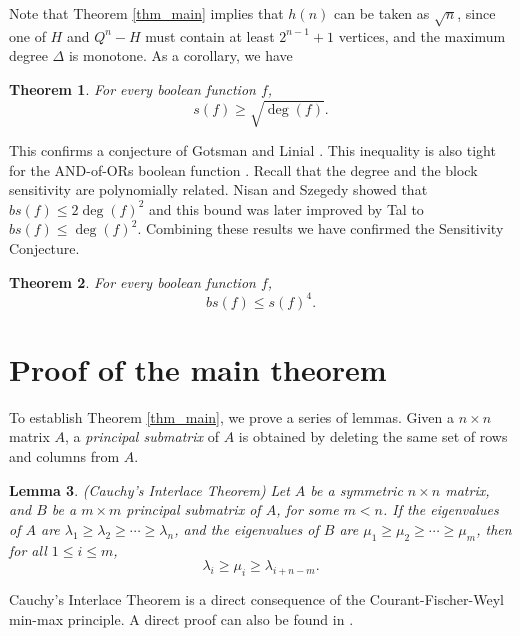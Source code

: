\documentclass[12pt]{article}
\theoremstyle{plain}
\newtheorem{theorem}{Theorem}[section]
\newtheorem{lemma}[theorem]{Lemma}
\theoremstyle{definition}
\begin{document}
Note that Theorem \ref{thm_main} implies that $h(n)$ can be taken as $\sqrt{n}$, since one of $H$ and $Q^n-H$ must contain at least $2^{n-1}+1$ vertices, and the maximum degree $\Delta$ is monotone. As a corollary, we have
\begin{theorem}
For every boolean function $f$,
$$s(f) \ge \sqrt{\deg(f)}.$$
\end{theorem}
This confirms a conjecture of Gotsman and Linial \cite{gotsman-linial}. This inequality is also tight for the AND-of-ORs boolean function \cite[Example 5.2]{survey}. Recall that the degree and the block sensitivity are polynomially related. Nisan and Szegedy \cite{nisan-szegedy} showed that $bs(f) \le 2 \deg(f)^2$ and this bound was later improved by Tal \cite{tal} to $bs(f) \le \deg(f)^2$. Combining these results we have confirmed the Sensitivity Conjecture.

\begin{theorem}\label{thm_sensitivity}
For every boolean function $f$, 
$$bs(f) \le s(f)^4.$$
\end{theorem}


\section{Proof of the main theorem}
To establish Theorem \ref{thm_main}, we prove a series of lemmas. Given a $n \times n$ matrix $A$, a {\it principal submatrix} of $A$ is obtained by deleting the same set of rows and columns from $A$.
\begin{lemma}\label{lem_cauchy} (Cauchy's Interlace Theorem)
Let $A$ be a symmetric $n \times n$ matrix, and $B$ be a $m \times m$ principal submatrix of $A$, for some $m<n$. If the eigenvalues of $A$ are $\lambda_1 \ge \lambda_2 \ge \cdots \ge \lambda_n$, and the eigenvalues of $B$ are $\mu_1 \ge \mu_2 \ge \cdots \ge \mu_m$, then for all $1 \le i \le m$,
$$\lambda_i \ge \mu_i \ge \lambda_{i+n-m}.$$ 
\end{lemma}
Cauchy's Interlace Theorem is a direct consequence of the Courant-Fischer-Weyl min-max principle. A direct proof can also be found in \cite{fisk}. 
\end{document}
